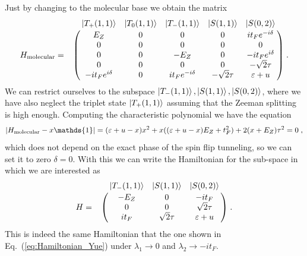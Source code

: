 \documentclass[a4paper,11pt]{article}
\begin{document}
Just by changing to the molecular base we obtain the matrix
\begin{equation}
H_{\text{molecular}}=\bordermatrix{~ & \ket{T_+(1,1)} & \ket{T_0(1,1)} & \ket{T_-(1,1)} & \ket{S(1,1)} & \ket{S(0,2)}\cr
	~ & E_Z   			 & 0     & 0      			  & 0    		   & it_Fe^{-i\delta}	 \cr
	~ & 0     			 & 0     & 0      			  & 0    		   & 0 		  	 		 \cr
	~ & 0     			 & 0     & -E_Z   			  & 0    		   & -it_Fe^{i\delta}    \cr
	~ & 0     			 & 0     & 0      			  & 0    		   & -\sqrt{2}\tau 		 \cr
	~ & -it_Fe^{i\delta} & 0     & it_Fe^{-i\delta}   & -\sqrt{2}\tau  & \varepsilon+u}\; .
\end{equation} We can restrict ourselves to the subspace $\ket{T_-(1,1)}, \ket{S(1,1)}, \ket{S(0,2)}$, where we have also neglect the triplet state $\ket{T_+(1,1)}$ assuming that the Zeeman splitting is high enough. Computing the characteristic polynomial we have the equation
\begin{equation}
	\abs{H_{\text{molecular}}-x\mathds{1}}=(\varepsilon+u-x)x^2+x((\varepsilon+u-x)E_Z+t_F^2)+2(x+E_Z)\tau^2=0\; ,
\end{equation}
which does not depend on the exact phase of the spin flip tunneling, so we can set it to zero $\delta=0$. With this we can write the Hamiltonian for the sub-space in which we are interested as
\begin{equation}
H=\bordermatrix{~ & \ket{T_-(1,1)} & \ket{S(1,1)} & \ket{S(0,2)}\cr
	~ & -E_Z & 0 & -it_F \cr
	~ & 0 & 0 & \sqrt{2}\tau \cr
	~ & it_F & \sqrt{2}\tau & \varepsilon+u \cr}\; .
\end{equation}
This is indeed the same Hamiltonian that the one shown in Eq.~(\ref{eq:Hamiltonian_Yue}) under $\lambda_1\rightarrow 0$ and $\lambda_2\rightarrow -it_F$.

\newpage


\end{document}
